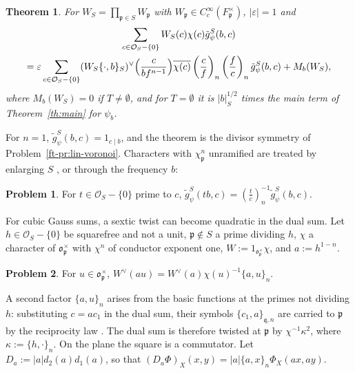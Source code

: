 \documentclass[reqno]{amsart}
\providecommand{\qr}[2]{\left(\frac{#1}{#2}\right)}
\newcommand{\oo}{\mathfrak{o}}
\newcommand{\pp}{\mathfrak{p}}
\numberwithin{equation}{section}
\theoremstyle{definition}
\newtheorem{problem}{Problem}[section]
\theoremstyle{plain}
\newtheorem{theorem}{Theorem}[section]
\begin{document}
\begin{theorem}\label{th:gauss-sums}
  For $W_S = \prod_{\pp \in S} W_\pp$ with $W_\pp \in C_c^\infty(F_\pp^\times)$, $\lvert \varepsilon \rvert = 1$ and
  \begin{multline*}
    \sum_{c \in \mathcal{O}_S - \{0\}} W_S(c) \chi(c) \tilde{g}_\psi^S(b, c)
    \\
    = \varepsilon \sum_{c \in \mathcal{O}_S - \{0\}} (W_S \{\cdot, b\}_S)^\vee \Bigl( \frac{c}{b f^{n-1}} \Bigr) \overline{\chi(c)} \qr{c}{f}_n \qr{f}{c}_n \tilde{g}_\psi^S(b, c) + M_b(W_S),
  \end{multline*}
  where $M_b(W_S) = 0$ if $T \neq \emptyset$, and for $T = \emptyset$ it is $\lvert b \rvert_S^{1/2}$ times the main term of Theorem~\ref{th:main} for $\psi_b$.
\end{theorem}

For $n = 1$, $\tilde{g}_\psi^S(b, c) = 1_{c \mid b}$, and the theorem is the divisor symmetry of Problem~\ref{ft-pr:lin-voronoi}.  Characters with $\chi_\pp^n$ unramified are treated by enlarging $S$ \cite[Remark~10.35]{N}, or through the frequency $b$:

\begin{problem}\label{pr:frequency-twist}
  For $t \in \mathcal{O}_S - \{0\}$ prime to $c$, $\tilde{g}_\psi^S(t b, c) = \qr{t}{c}_n^{-1} \tilde{g}_\psi^S(b, c)$.
\end{problem}

For cubic Gauss sums, a sextic twist can become quadratic in the dual sum.  Let $h \in \mathcal{O}_S - \{0\}$ be squarefree and not a unit, $\pp \notin S$ a prime dividing $h$, $\chi$ a character of $\oo_\pp^\times$ with $\chi^n$ of conductor exponent one, $W := 1_{\oo_\pp^\times} \chi$, and $a := h^{1-n}$.

\begin{problem}\label{pr:first-symbol}
  For $u \in \oo_\pp^\times$, $W^\vee(a u) = W^\vee(a) \chi(u)^{-1} \{a, u\}_n$.
\end{problem}

A second factor $\{a, u\}_n$ arises from the basic functions at the primes not dividing $h$: substituting $c = a c_1$ in the dual sum, their symbols $\{c_1, a\}_{\mathfrak{q}, n}$ are carried to $\pp$ by the reciprocity law \cite[(10.26)--(10.27)]{N}.  The dual sum is therefore twisted at $\pp$ by $\chi^{-1} \kappa^2$, where $\kappa := \{h, \cdot\}_n$.  On the plane the square is a commutator.  Let $D_a := \lvert a \rvert d_2(a) d_1(a)$, so that $(D_a \Phi)_X(x, y) = \lvert a \rvert \{a, x\}_n \Phi_X(a x, a y)$.
\end{document}
